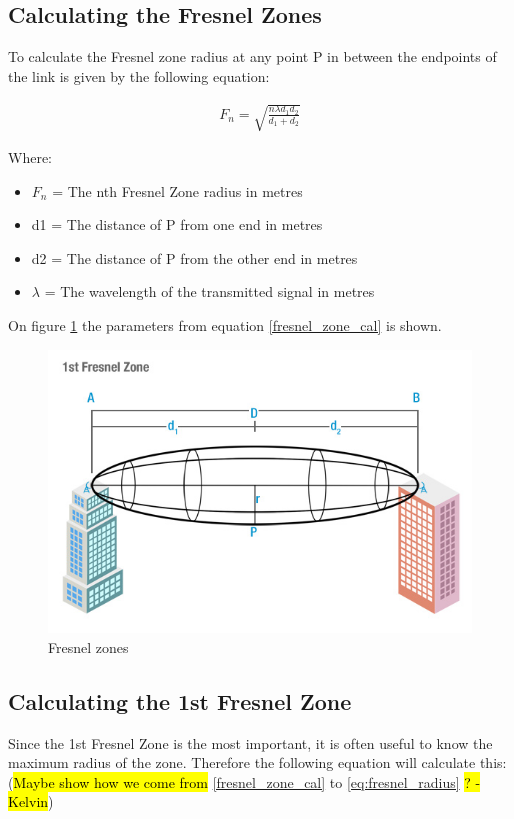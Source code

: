 \subsection{Calculating the Fresnel Zones}
To calculate the Fresnel zone radius at any point P in between the endpoints of the link is given by the following equation: 

\begin{align}
F_n = \sqrt{\frac{n \lambda d_1 d_2}{d_1+d_2}} \label{fresnel_zone_cal}
\end{align}

Where:
\begin{itemize}[label=]
\item $F_n$ = The nth Fresnel Zone radius in metres
\item d1 = The distance of P from one end in metres
\item d2 = The distance of P from the other end in metres
\item $\lambda$ = The wavelength of the transmitted signal in metres
\end{itemize}

\noindent On figure \ref{fig:fresnel_zones} the parameters from equation \ref{fresnel_zone_cal} is shown. 
\begin{figure}[H]
	\centering
	\includegraphics[scale=0.70]{figures/fresnel_zone.jpg}
	\caption{Fresnel zones}
	\label{fig:fresnel_zones}
\end{figure}  

\subsection{Calculating the 1st Fresnel Zone}
Since the 1st Fresnel Zone is the most important, it is often useful to know the maximum radius of the zone. Therefore the following equation will calculate this: (\hl{Maybe show how we come from} \ref{fresnel_zone_cal} to \ref{eq:fresnel_radius} \hl{? - Kelvin})

